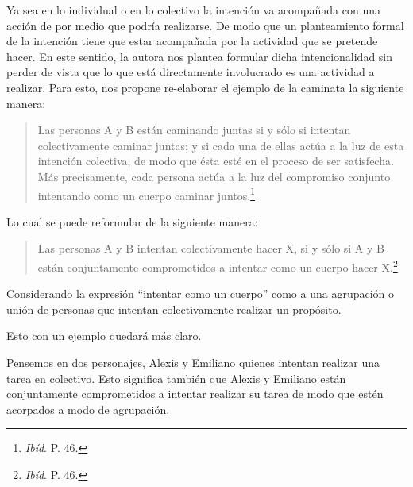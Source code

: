 \documentclass[oneside]{book}
\begin{document}


Ya sea en lo individual o en lo colectivo la intención va acompañada con una acción de por medio que podría realizarse. De modo que un planteamiento formal de la intención tiene que estar acompañada por la actividad que se pretende hacer. En este sentido, la autora nos plantea formular dicha intencionalidad sin perder de vista que lo que está directamente involucrado es una actividad a realizar. Para esto, nos propone re-elaborar el ejemplo de la caminata la siguiente manera:

\begin{quote}
Las personas A y B están caminando juntas si y sólo si intentan colectivamente caminar juntas; y si cada una de ellas actúa a la luz de esta intención colectiva, de modo que ésta esté en el proceso de ser satisfecha. Más precisamente, cada persona actúa a la luz del compromiso conjunto intentando como un cuerpo caminar juntos.\footnote{\textit{Ibíd}. P. 46.} 
\end{quote}

Lo cual se puede reformular de la siguiente manera:

\begin{quote}
    Las personas A y B intentan colectivamente hacer X, si y sólo si A y B están conjuntamente comprometidos a intentar como un cuerpo hacer X.\footnote{\textit{Ibíd}. P. 46.}
\end{quote}

Considerando la expresión “intentar como un cuerpo” como a una agrupación o unión de personas que intentan colectivamente realizar un propósito.

Esto con un ejemplo quedará más claro.

Pensemos en dos personajes, Alexis y Emiliano quienes intentan realizar una tarea en colectivo. Esto significa también que Alexis y Emiliano están conjuntamente comprometidos a intentar realizar su tarea de modo que estén acorpados a modo de agrupación.
\end{document}
